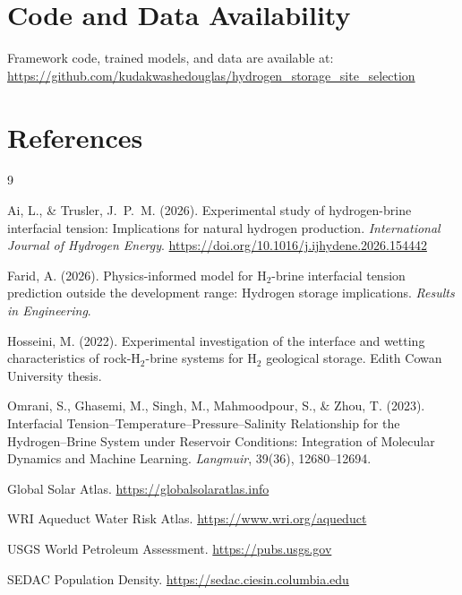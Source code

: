 \documentclass[11pt]{article}
\begin{document}
\section*{Code and Data Availability}
Framework code, trained models, and data are available at:
\url{https://github.com/kudakwashedouglas/hydrogen_storage_site_selection}

\section*{References}
\begin{thebibliography}{9}

Ai, L., \& Trusler, J.~P.~M. (2026).
Experimental study of hydrogen-brine interfacial tension: Implications for natural hydrogen production.
\textit{International Journal of Hydrogen Energy}. \url{https://doi.org/10.1016/j.ijhydene.2026.154442}

Farid, A. (2026).
Physics-informed model for H$_2$-brine interfacial tension prediction outside the development range: Hydrogen storage implications.
\textit{Results in Engineering}.

Hosseini, M. (2022).
Experimental investigation of the interface and wetting characteristics of rock-H$_2$-brine systems for H$_2$ geological storage.
Edith Cowan University thesis.

Omrani, S., Ghasemi, M., Singh, M., Mahmoodpour, S., \& Zhou, T. (2023).
Interfacial Tension--Temperature--Pressure--Salinity Relationship for the Hydrogen--Brine System under Reservoir Conditions: Integration of Molecular Dynamics and Machine Learning.
\textit{Langmuir}, 39(36), 12680--12694.

Global Solar Atlas. \url{https://globalsolaratlas.info}

WRI Aqueduct Water Risk Atlas. \url{https://www.wri.org/aqueduct}

USGS World Petroleum Assessment. \url{https://pubs.usgs.gov}

SEDAC Population Density. \url{https://sedac.ciesin.columbia.edu}

\end{thebibliography}
\end{document}
